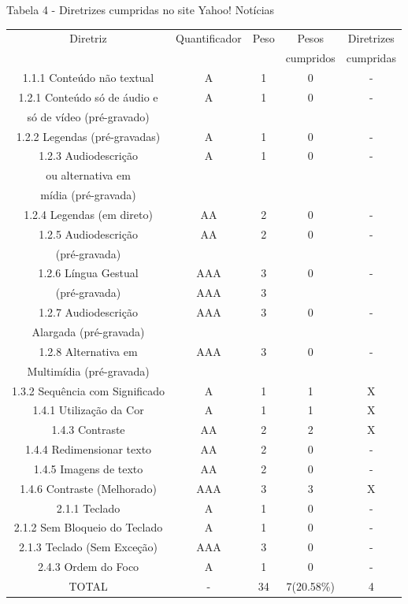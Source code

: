 \documentclass[a4paper]{article}
\begin{document}
\begin{titlepage}
Tabela 4 - Diretrizes cumpridas no site Yahoo! Notícias\\[-1cm]
\begin{center}
	\fontsize{8pt}{8pt}\selectfont	
	\begin{longtable}{|c|c|c|c|c|}
		\hline
		Diretriz & Quantificador & Peso & Pesos & Diretrizes\\
		& & & cumpridos & cumpridas\\
		\hline
		1.1.1 Conteúdo não textual & A & 1 & 0 & - \\
		\hline
		1.2.1 Conteúdo só de áudio e & A & 1 & 0 & - \\
		só de vídeo (pré-gravado) & & & & \\
		\hline
		1.2.2 Legendas (pré-gravadas) & A & 1 & 0 & - \\
		\hline
		1.2.3 Audiodescrição & A & 1 & 0 & - \\
		ou alternativa em & & & & \\
		mídia (pré-gravada) & & & & \\
		\hline
		1.2.4 Legendas (em direto) & AA & 2 & 0 & - \\
		\hline
		1.2.5 Audiodescrição & AA & 2 & 0 & - \\
		(pré-gravada) & & & & \\
		\hline
		1.2.6 Língua Gestual & AAA & 3 & 0 & - \\
		(pré-gravada) & AAA & 3 & & \\
		\hline
		1.2.7 Audiodescrição & AAA & 3 & 0 & - \\
		Alargada (pré-gravada) & & & & \\
		\hline
		1.2.8 Alternativa em & AAA & 3 & 0 & - \\
		Multimídia (pré-gravada) & & & & \\
		\hline
		1.3.2 Sequência com Significado & A & 1 & 1 & X \\
		\hline
		1.4.1 Utilização da Cor & A & 1 & 1 & X \\
		\hline
		1.4.3 Contraste & AA & 2 & 2 & X \\
		\hline
		1.4.4 Redimensionar texto & AA & 2 & 0 & - \\
		\hline
		1.4.5 Imagens de texto & AA & 2 & 0 & - \\
		\hline
		1.4.6 Contraste (Melhorado) & AAA & 3 & 3 & X \\
		\hline
		2.1.1 Teclado & A & 1 & 0 & - \\
		\hline
		2.1.2 Sem Bloqueio do Teclado & A & 1 & 0 & - \\
		\hline
		2.1.3 Teclado (Sem Exceção) & AAA & 3 & 0 & - \\
		\hline
		2.4.3 Ordem do Foco & A & 1 & 0 & - \\
		\hline
		TOTAL & - & 34 & 7(20.58\%) & 4 \\
		\hline
	\end{longtable}
\end{center}


\end{titlepage}
\end{document}
